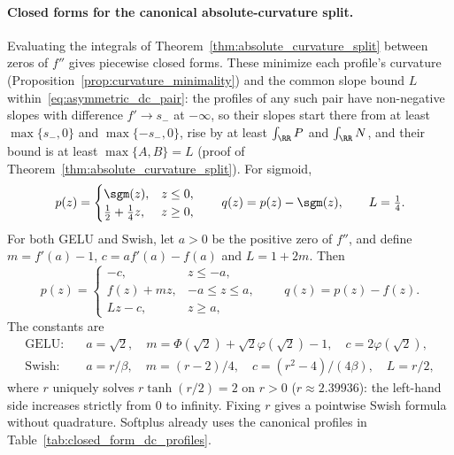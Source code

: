\paragraph{Closed forms for the canonical absolute-curvature split.}
Evaluating the integrals of Theorem~\ref{thm:absolute_curvature_split} between zeros of $f''$ gives piecewise closed forms. These minimize each profile's curvature (Proposition~\ref{prop:curvature_minimality}) and the common slope bound $L$ within~\eqref{eq:asymmetric_dc_pair}: the profiles of any such pair have non-negative slopes with difference $f'\to s_-$ at $-\infty$, so their slopes start there from at least $\max\{s_-,0\}$ and $\max\{-s_-,0\}$, rise by at least $\int_{\RR}P$ and $\int_{\RR}N$, and their bound is at least $\max\{A,B\}=L$ (proof of Theorem~\ref{thm:absolute_curvature_split}). For sigmoid,
\begin{equation}
    p(z)=\begin{cases}
        \sgm(z),&z\le0,\\
        \tfrac12+\tfrac14z,&z\ge0,
    \end{cases}
    \qquad q(z)=p(z)-\sgm(z),\qquad L=\tfrac14.
    \label{eq:sigmoid_canonical_dc}
\end{equation}
For both GELU and Swish, let $a>0$ be the positive zero of $f''$, and define $m=f'(a)-1$, $c=af'(a)-f(a)$ and $L=1+2m$. Then
\begin{equation}
    p(z)=\begin{cases}
        -c,&z\le-a,\\
        f(z)+mz,&-a\le z\le a,\\
        Lz-c,&z\ge a,
    \end{cases}
    \qquad q(z)=p(z)-f(z).
    \label{eq:gelu_swish_canonical_dc}
\end{equation}
The constants are
\begin{equation}
\begin{aligned}
    \text{GELU:}\quad &a=\sqrt2,\quad
    m=\Phi(\sqrt2)+\sqrt2\varphi(\sqrt2)-1,\quad c=2\varphi(\sqrt2),\\
    \text{Swish:}\quad &a=r/\beta,\quad m=(r-2)/4,\quad
    c=(r^2-4)/(4\beta),\quad L=r/2,
\end{aligned}
    \label{eq:canonical_activation_constants}
\end{equation}
where $r$ uniquely solves $r\tanh(r/2)=2$ on $r>0$ ($r\approx2.39936$): the left-hand side increases strictly from $0$ to infinity. Fixing $r$ gives a pointwise Swish formula without quadrature. Softplus already uses the canonical profiles in Table~\ref{tab:closed_form_dc_profiles}.


